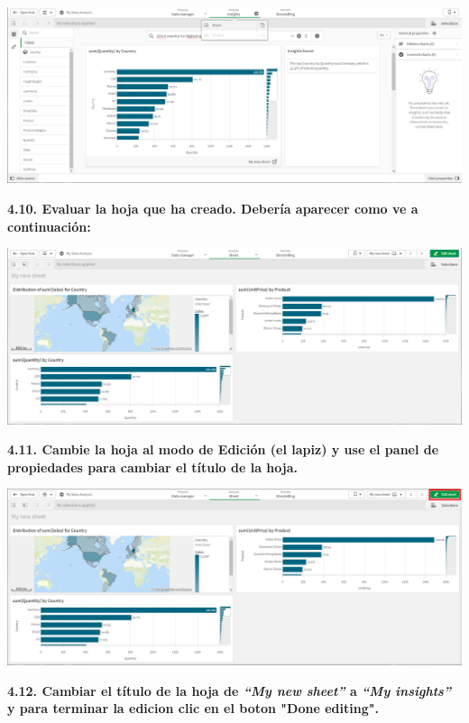 \documentclass{article}
\begin{document}
    \begin{center}
		\includegraphics[width=14cm]{./images/12} 
	\end{center}

\newpage
\textbf{4.10. Evaluar la hoja que ha creado.
 Debería aparecer como ve a continuación:}

    \begin{center}
		\includegraphics[width=14cm]{./images/13} 
	\end{center}
	
\textbf{4.11. Cambie la hoja al modo
 de \textbf{Edición} (el lapiz) y use el panel de 
propiedades para cambiar el título de la hoja.}

    \begin{center}
		\includegraphics[width=14cm]{./images/14} 
	\end{center}
\newpage
\textbf{4.12. Cambiar el 
título de la hoja de \textit{\textbf{“My new sheet”}} a
 \textit{\textbf{“My insights”}} y para terminar la edicion 
 clic en el boton \textbf{"Done editing"}.}
\end{document}
